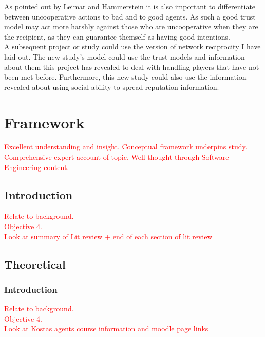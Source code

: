 \documentclass[]{final_report}
\begin{document}
As pointed out by Leimar and Hammerstein it is also important to differentiate between uncooperative actions to bad and to good agents. As such a good trust model may act more harshly against those who are uncooperative when they are the recipient, as they can guarantee themself as having good intentions.\\ 
A subsequent project or study could use the version of network reciprocity I have laid out. The new study's model could use the trust models and information about them this project has revealed to deal with handling players that have not been met before. Furthermore, this new study could also use the information revealed about using social ability to spread reputation information.

\chapter{Framework}
\textcolor{red}{Excellent understanding and insight. Conceptual framework underpins study. Comprehensive expert account of topic. Well thought through Software Engineering content.}
\section{Introduction}
\textcolor{red}{Relate to background.\\
Objective 4.\\
Look at summary of Lit review + end of each section of lit review}

\section{Theoretical}
\subsection{Introduction}
\textcolor{red}{Relate to background.\\
Objective 4.\\
Look at Kostas agents course information and moodle page links}
\end{document}
